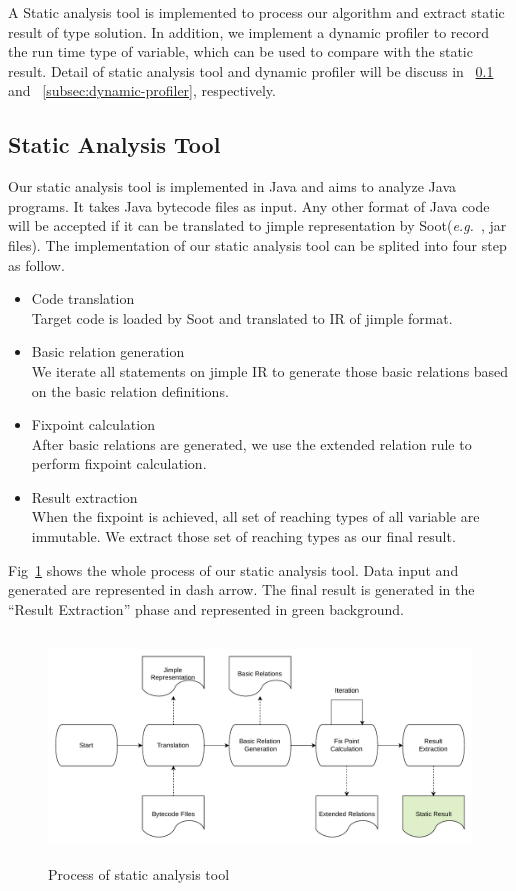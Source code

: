 \documentclass{fac}
\newcommand\eg{\textit{e.g.\ }}
\begin{document}
A Static analysis tool is implemented to process our algorithm and extract static result of type solution. In addition, we implement a dynamic profiler to record the run time type of variable, which can be used to compare with the static result. Detail of static analysis tool and dynamic profiler will be discuss in ~\ref{subsec:static-analysis-tool} and ~\ref{subsec:dynamic-profiler}, respectively.

\subsection{Static Analysis Tool}\label{subsec:static-analysis-tool}
Our static analysis tool is implemented in Java and aims to analyze Java programs. It takes Java bytecode files as input. Any other format of Java code will be accepted if it can be translated to jimple representation by Soot(\eg, jar files). The implementation of our static analysis tool can be splited into four step as follow.
\begin{itemize}
\item Code translation\\
Target code is loaded by Soot and translated to IR of jimple format.
\item Basic relation generation\\
We iterate all statements on jimple IR to generate those basic relations based on the basic relation definitions. 
\item Fixpoint calculation\\
After basic relations are generated, we use the extended relation rule to perform fixpoint calculation.
\item Result extraction\\
When the fixpoint is achieved, all set of reaching types of all variable are immutable. We extract those set of reaching types as our final result.
\end{itemize}
Fig~\ref{fig:static-process} shows the whole process of our static analysis tool. Data input and generated are represented in dash arrow. The final result is generated in the ``Result Extraction'' phase and represented in green background.

\begin{figure}
\centering
\includegraphics[width=16cm,height=6cm]{static-process.pdf}
\caption{Process of static analysis tool}
\label{fig:static-process}
\end{figure}
\end{document}
